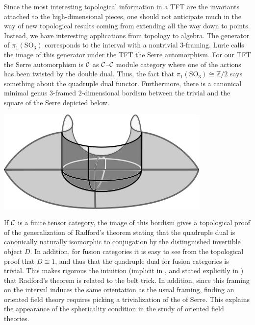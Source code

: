 \documentclass{amsart}
\begin{document}
Since the most interesting topological information in a TFT are the invariants attached to the high-dimensional pieces, one should not anticipate much in the way of new topological results coming from extending all the way down to points.  Instead, we have interesting applications from topology to algebra.  The generator of $\pi_1(\mathrm{SO}_3)$ corresponds to the interval with a nontrivial $3$-framing.  Lurie calls the image of this generator under the TFT the Serre automorphism.  For our TFT the Serre automorphism is $\mathcal C$ as $\mathcal C$--$\mathcal C$ module category where one of the actions has been twisted by the double dual.  Thus, the fact that $\pi_1(\mathrm{SO}_3) \cong \mathbb{Z}/2$ says something about the quadruple dual functor.  Furthermore, there is a canonical minimal genus $3$-framed $2$-dimensional bordism between the trivial and the square of the Serre depicted below.

\begin{center}
\includegraphics{cobordism.png}
\end{center}

If $\mathcal C$ is a finite tensor category, the image of this bordism gives a topological proof of the generalization of Radford's theorem \cite{MR0407069, MR2097289} stating that the quadruple dual is canonically naturally isomorphic to conjugation by the distinguished invertible object $D$.  In addition, for fusion categories it is easy to see from the topological proof that $D \cong 1$, and thus that the quadruple dual for fusion categories is trivial.  This makes rigorous the intuition (implicit in \cite{MR2559711}, and stated explicitly in \cite{0901.3975} ) that Radford's theorem is related to the belt trick.    In addition, since this framing on the interval induces the same orientation as the usual framing, finding an oriented field theory requires picking a trivialization of the of Serre.  This explains the appearance of the sphericality condition in the study of oriented field theories.
\end{document}

